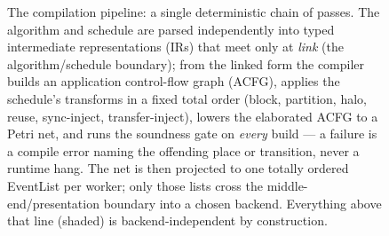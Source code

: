 \begin{figure}[tbp]
  \caption[The compilation pipeline]{The compilation pipeline: a single
    deterministic chain of passes. The algorithm and schedule are parsed
    independently into typed intermediate representations (IRs) that meet only at
    \emph{link} (the algorithm/schedule boundary); from the linked form the
    compiler builds an application control-flow graph (ACFG), applies the
    schedule's transforms in a fixed total order
    (block, partition, halo, reuse, sync-inject, transfer-inject), lowers the
    elaborated ACFG to a Petri net, and runs the soundness gate on \emph{every}
    build --- a failure is a compile error naming the offending place or
    transition, never a runtime hang. The net is then projected to one totally
    ordered EventList per worker; only those lists cross the
    middle-end/presentation boundary into a chosen backend. Everything above that
    line (shaded) is backend-independent by construction.}
  \label{fig:pipeline}
\end{figure}
